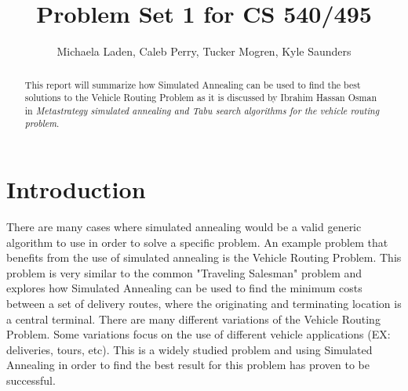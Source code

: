 \documentclass[11pt]{article}
\newcommand{\<}{\langle}
\renewcommand{\>}{\rangle}
\theoremstyle{definition}
\begin{document}
    \title{Problem Set 1 for CS 540/495}
     \author{Michaela Laden, Caleb Perry, Tucker Mogren, Kyle Saunders}				
    \maketitle
    \begin{abstract}  %
    This report will summarize how Simulated Annealing can be used to find the best solutions to the Vehicle Routing Problem as it is discussed by Ibrahim Hassan Osman in \textit{Metastrategy simulated annealing and Tabu search algorithms for the vehicle routing problem}. 
    \end{abstract}
    
    \section{Introduction} 
    There are many cases where simulated annealing would be a valid generic algorithm to use in order to solve a specific problem. An example problem that benefits from the use of simulated annealing is the Vehicle Routing Problem. This problem is very similar to the common "Traveling Salesman" problem and explores how Simulated Annealing can be used to find the minimum costs between a set of delivery routes, where the originating and terminating location is a central terminal. There are many different variations of the Vehicle Routing Problem. Some variations focus on the use of different vehicle applications (EX: deliveries, tours, etc). This is a widely studied problem and using Simulated Annealing in order to find the best result for this problem has proven to be successful. 
    
    
    
\end{document}

